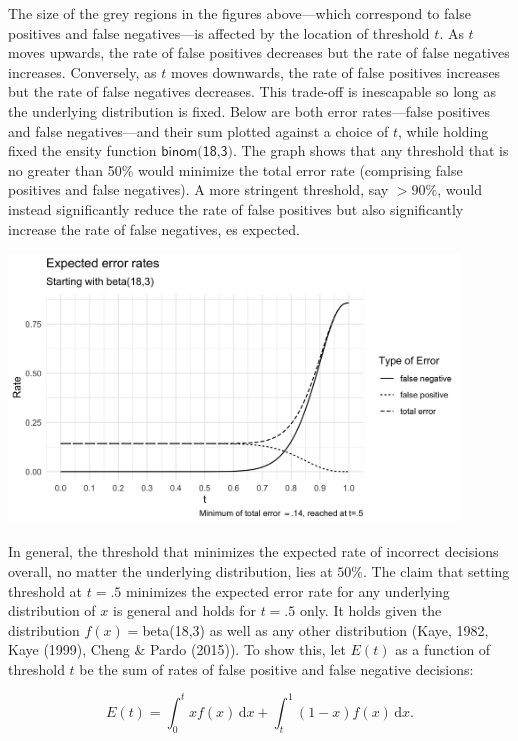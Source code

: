 \documentclass[10pt,dvipsnames]{scrartcl}
\begin{document}
The size of the grey regions in the figures above---which correspond to
false positives and false negatives---is affected by the location of
threshold \(t\). As \(t\) moves upwards, the rate of false positives
decreases but the rate of false negatives increases. Conversely, as
\(t\) moves downwards, the rate of false positives increases but the
rate of false negatives decreases. This trade-off is inescapable so long
as the underlying distribution is fixed. Below are both error
rates---false positives and false negatives---and their sum plotted
against a choice of \(t\), while holding fixed the ensity function
\(\textsf{binom(18,3)}\). The graph shows that any threshold that is no
greater than 50\% would minimize the total error rate (comprising false
positives and false negatives). A more stringent threshold, say
\(>90\%\), would instead significantly reduce the rate of false
positives but also significantly increase the rate of false negatives,
es expected.

\begin{center}
    \includegraphics[width=12cm]{errors.png}
\end{center}

In general, the threshold that minimizes the expected rate of incorrect
decisions overall, no matter the underlying distribution, lies at
\(50\%\). The claim that setting threshold at \(t=.5\) minimizes the
expected error rate for any underlying distribution of \(x\) is general
and holds for \(t=.5\) only. It holds given the distribution
\(f(x)=\)beta(18,3) as well as any other distribution (Kaye, 1982, Kaye
(1999), Cheng \& Pardo (2015)). To show this, let \(E(t)\) as a function
of threshold \(t\) be the sum of rates of false positive and false
negative decisions:

\[E(t) = \int_0^t \! x f(x) \, \mathrm{d}x + \int_t^1 \! (1-x) f(x) \, \mathrm{d}x.
\]
\end{document}

